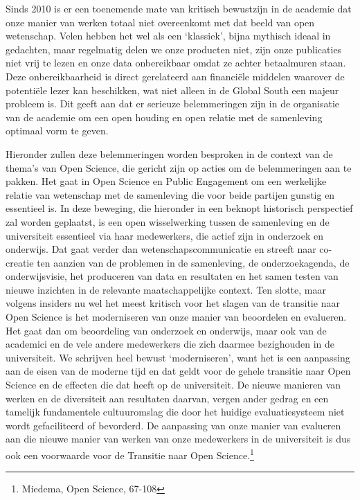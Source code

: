 \documentclass{jote-book}
\begin{document}
	Sinds 2010 is er een toenemende mate van kritisch bewustzijn in de academie dat onze manier van werken totaal niet overeenkomt met dat beeld van open wetenschap. Velen hebben het wel als een ‘klassiek', bijna mythisch ideaal in gedachten, maar regelmatig delen we onze producten niet, zijn onze publicaties niet vrij te lezen en onze data onbereikbaar omdat ze achter betaalmuren staan. Deze onbereikbaarheid is direct gerelateerd aan financiële middelen waarover de potentiële lezer kan beschikken, wat niet alleen in de Global South een majeur probleem is. Dit geeft aan dat er serieuze belemmeringen zijn in de organisatie van de academie om een open houding en open relatie met de samenleving optimaal vorm te geven.



	Hieronder zullen deze belemmeringen worden besproken in de context van de thema's van Open Science, die gericht zijn op acties om de belemmeringen aan te pakken. Het gaat in Open Science en Public Engagement om een werkelijke relatie van wetenschap met de samenleving die voor beide partijen gunstig en essentieel is. In deze beweging, die hieronder in een beknopt historisch perspectief zal worden geplaatst, is een open wisselwerking tussen de samenleving en de universiteit essentieel via haar medewerkers, die actief zijn in onderzoek en onderwijs. Dat gaat verder dan wetenschapscommunicatie en streeft naar co-creatie ten aanzien van de problemen in de samenleving, de onderzoekagenda, de onderwijsvisie, het produceren van data en resultaten en het samen testen van nieuwe inzichten in de relevante maatschappelijke context. Ten slotte, maar volgens insiders nu wel het meest kritisch voor het slagen van de transitie naar Open Science is het moderniseren van onze manier van beoordelen en evalueren. Het gaat dan om beoordeling van onderzoek en onderwijs, maar ook van de academici en de vele andere medewerkers die zich daarmee bezighouden in de universiteit. We schrijven heel bewust ‘moderniseren', want het is een aanpassing aan de eisen van de moderne tijd en dat geldt voor de gehele transitie naar Open Science en de effecten die dat heeft op de universiteit. De nieuwe manieren van werken en de diversiteit aan resultaten daarvan, vergen ander gedrag en een tamelijk fundamentele cultuuromslag die door het huidige evaluatiesysteem niet wordt gefaciliteerd of bevorderd. De aanpassing van onze manier van evalueren aan die nieuwe manier van werken van onze medewerkers in de universiteit is dus ook een voorwaarde voor de Transitie naar Open Science.\footnote{Miedema, Open Science, 67-108}
\end{document}
